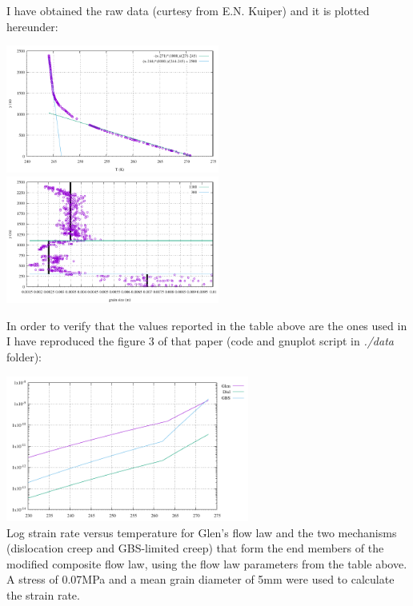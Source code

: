 I have obtained the raw data (curtesy from E.N. Kuiper) and it is plotted hereunder:
\begin{center}
\includegraphics[width=7cm]{python_codes/fieldstone_59/data/temperature}
\includegraphics[width=7cm]{python_codes/fieldstone_59/data/grain_size}\\
{\captionfont }
\end{center}

In order to verify that the values reported in the table above are the ones 
used in \cite{kudd19} I have reproduced the figure 3 of that paper (code and gnuplot
script in {\sl ./data} folder):
\begin{center}
\includegraphics[width=8cm]{python_codes/fieldstone_59/data/strainrate}\\
{\captionfont Log strain rate versus temperature for Glen’s flow law and 
the two mechanisms (dislocation creep and GBS-limited creep) that form the end members 
of the modified composite flow law, using the flow law parameters from the table above. 
A stress of 0.07MPa and a mean grain diameter of 5mm were used to calculate the strain rate.}
\end{center}


